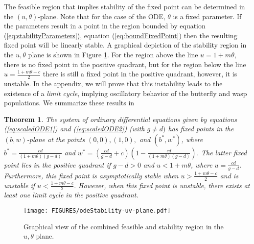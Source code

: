 \documentclass[review,authoryear]{elsarticle}
\newtheorem{theorem}{Theorem}[section]
\begin{document}
The feasible region that implies stability of the fixed point can be
determined in the $(u,\theta)$-plane. Note that for the case of the ODE, $\theta$ is a fixed parameter. If the parameters result in a point in
the region bounded by equation (\ref{eq:stabilityParameters}),
equation (\ref{eq:boundFixedPoint}) then the resulting
fixed point will be linearly stable. A graphical depiction of the
stability region in the $u,\theta$ plane is shown in Figure
\ref{fig:uvStabilityRegion}. For the region above the line $u=1+m\theta$, there is no fixed point in the positive quadrant, but for the region below the line $u = \frac{1+m\theta-c}{2}$ there is still  a fixed point in the positive quadrant, however, it is unstable.  In the appendix, we will prove that this instability leads to the existence of a \emph{limit cycle}, implying oscillatory behavior of the butterfly and wasp populations. We summarize these results in 

\begin{theorem}  The system of ordinary differential equations given by equations (\ref{eq:scaledODE1}) and (\ref{eq:scaledODE2}) (with $g\ne d)$ has fixed points in the $(b,w)$-plane at the points $(0,0), (1,0),$ and $(b^*,w^*)$, where $b^*=\frac{cd}{(1+m\theta)(g-d)}$ and
$w^*=\left(\frac{cd}{g-d}+c\right)\left(1-\frac{cd}{(1+m\theta)(g-d)}\right)$.  The latter fixed point lies in the positive quadrant if $g-d>0$ and $u<1+m\theta$, where $u=\frac{cd}{g-d}.$
Furthermore, this fixed point is asymptotically stable when $u>\frac{1+m\theta-c}{2}$ and is unstable if $u<\frac{1+m\theta-c}{2}.$ However, when this fixed point is unstable, there exists at least one  limit cycle in the positive quadrant.

\end{theorem}

\begin{figure}[htb]
  \centering
  \texttt{[image: FIGURES/odeStability-uv-plane.pdf]}
  \caption[Stability region in the $u,\theta$ plane.]{Graphical view of the
    combined feasible and stability region in the $u,\theta$ plane.}
  \label{fig:uvStabilityRegion}
\end{figure}
\end{document}
